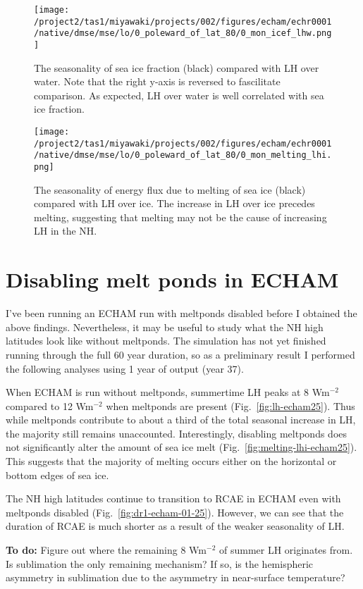 \documentclass{article}
\begin{document}
\begin{figure}
    \texttt{[image: /project2/tas1/miyawaki/projects/002/figures/echam/echr0001/native/dmse/mse/lo/0\_poleward\_of\_lat\_80/0\_mon\_icef\_lhw.png]}
    \caption{The seasonality of sea ice fraction (black) compared with LH over water. Note that the right y-axis is reversed to fascilitate comparison. As expected, LH over water is well correlated with sea ice fraction.}
    \label{fig:icef-lhw-echam}
\end{figure}

\begin{figure}
    \texttt{[image: /project2/tas1/miyawaki/projects/002/figures/echam/echr0001/native/dmse/mse/lo/0\_poleward\_of\_lat\_80/0\_mon\_melting\_lhi.png]}
    \caption{The seasonality of energy flux due to melting of sea ice (black) compared with LH over ice. The increase in LH over ice precedes melting, suggesting that melting may not be the cause of increasing LH in the NH.}
    \label{fig:melting-lhi-echam}
\end{figure}

\section{Disabling melt ponds in ECHAM}
I've been running an ECHAM run with meltponds disabled before I obtained the above findings. Nevertheless, it may be useful to study what the NH high latitudes look like without meltponds. The simulation has not yet finished running through the full 60 year duration, so as a preliminary result I performed the following analyses using 1 year of output (year 37).

When ECHAM is run without meltponds, summertime LH peaks at 8 Wm$^{-2}$ compared to 12 Wm$^{-2}$ when meltponds are present (Fig.~\ref{fig:lh-echam25}). Thus while meltponds contribute to about a third of the total seasonal increase in LH, the majority still remains unaccounted. Interestingly, disabling meltponds does not significantly alter the amount of sea ice melt (Fig.~\ref{fig:melting-lhi-echam25}). This suggests that the majority of melting occurs either on the horizontal or bottom edges of sea ice.

The NH high latitudes continue to transition to RCAE in ECHAM even with meltponds disabled (Fig.~\ref{fig:dr1-echam-01-25}). However, we can see that the duration of RCAE is much shorter as a result of the weaker seasonality of LH.  

\textbf{To do:} Figure out where the remaining 8 Wm$^{-2}$ of summer LH originates from. Is sublimation the only remaining mechanism? If so, is the hemispheric asymmetry in sublimation due to the asymmetry in near-surface temperature?
\end{document}
